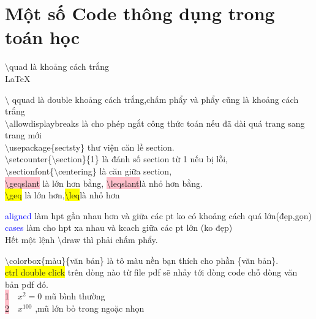 \documentclass{article}
\begin{document}
\Large\section*{Một số Code thông dụng trong toán học}
\large $\setminus$quad là khoảng cách trắng\\

\LaTeX\

$\setminus$ qquad là double khoảng cách trắng,chấm phẩy và phẩy cũng là khoảng cách trắng\\

$\setminus$allowdisplaybreaks là cho phép ngắt công thức toán nếu đã dài quá trang sang trang mới\\

$\setminus$usepackage\{sectsty\} thư viện căn lề section.\\

$\setminus$setcounter\{$\setminus$section\}\{1\} là đánh số section từ 1 nếu bị lỗi,\\

$\setminus$sectionfont\{$\setminus$centering\} là căn giữa section,\\


\colorbox{pink}{$\setminus$geqslant} là lớn hơn bằng, \colorbox{pink}{$\setminus$leqslant}là nhỏ hơn bằng.\\

\colorbox{yellow}{$\setminus$geq} là lớn hơn,\colorbox{yellow}{$\setminus$leq}là nhỏ hơn

\textcolor{blue}{aligned} làm hpt gần nhau hơn và giữa các pt ko có khoảng cách quá lớn(đẹp,gọn)\\

\textcolor{blue}{cases} làm cho hpt xa nhau và kcach giữa các pt lớn (ko đẹp)\\

Hết một lệnh $\setminus$draw thì phải chấm phẩy.

$\setminus$colorbox\{màu\}\{văn bản\} là tô màu nền bạn thích cho phần \{văn bản\}.\\

\colorbox{yellow}{ctrl double click} trên dòng nào từ file pdf sẽ nhảy tới dòng code chỗ dòng văn bản pdf đó.\\

\colorbox{pink}{1}$\quad x^2=0$  \quad     mũ bình thường \\

\colorbox{pink}{2}$\quad x^{100}$ \quad ,mũ lớn bỏ trong ngoặc nhọn\\
\end{document}
